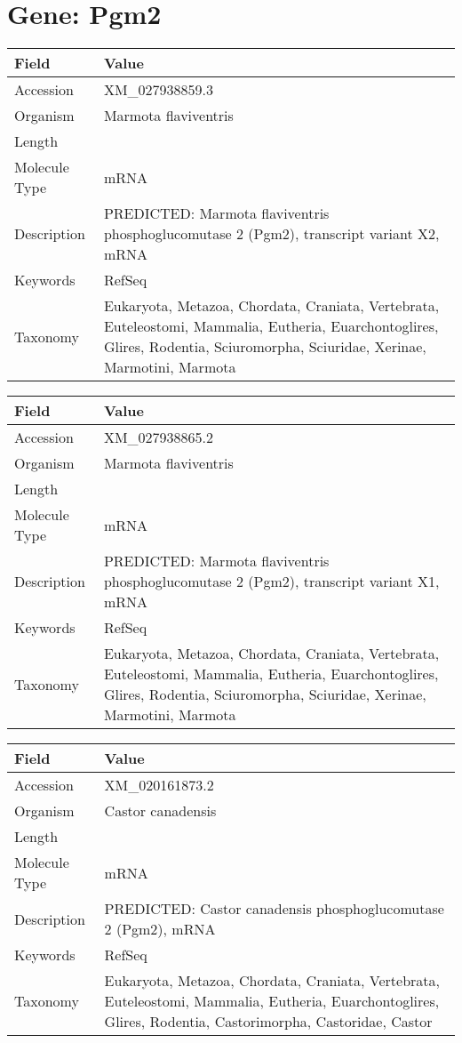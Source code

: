 \documentclass[10pt]{article}
\begin{document}
\section*{Gene: Pgm2}
{\footnotesize
\begin{longtable}{>{\raggedright\arraybackslash}p{4.5cm} >{\raggedright\arraybackslash}p{11.5cm}}
\textbf{Field} & \textbf{Value} \\
\hline
Accession & XM\_027938859.3 \\
Organism & Marmota flaviventris \\
Length & 2307 \\
Molecule Type & mRNA \\
Description & PREDICTED: Marmota flaviventris phosphoglucomutase 2 (Pgm2), transcript variant X2, mRNA \\
Keywords & RefSeq \\
Taxonomy & Eukaryota, Metazoa, Chordata, Craniata, Vertebrata, Euteleostomi, Mammalia, Eutheria, Euarchontoglires, Glires, Rodentia, Sciuromorpha, Sciuridae, Xerinae, Marmotini, Marmota \\
\end{longtable}
}

{\footnotesize
\begin{longtable}{>{\raggedright\arraybackslash}p{4.5cm} >{\raggedright\arraybackslash}p{11.5cm}}
\textbf{Field} & \textbf{Value} \\
\hline
Accession & XM\_027938865.2 \\
Organism & Marmota flaviventris \\
Length & 2265 \\
Molecule Type & mRNA \\
Description & PREDICTED: Marmota flaviventris phosphoglucomutase 2 (Pgm2), transcript variant X1, mRNA \\
Keywords & RefSeq \\
Taxonomy & Eukaryota, Metazoa, Chordata, Craniata, Vertebrata, Euteleostomi, Mammalia, Eutheria, Euarchontoglires, Glires, Rodentia, Sciuromorpha, Sciuridae, Xerinae, Marmotini, Marmota \\
\end{longtable}
}

{\footnotesize
\begin{longtable}{>{\raggedright\arraybackslash}p{4.5cm} >{\raggedright\arraybackslash}p{11.5cm}}
\textbf{Field} & \textbf{Value} \\
\hline
Accession & XM\_020161873.2 \\
Organism & Castor canadensis \\
Length & 2543 \\
Molecule Type & mRNA \\
Description & PREDICTED: Castor canadensis phosphoglucomutase 2 (Pgm2), mRNA \\
Keywords & RefSeq \\
Taxonomy & Eukaryota, Metazoa, Chordata, Craniata, Vertebrata, Euteleostomi, Mammalia, Eutheria, Euarchontoglires, Glires, Rodentia, Castorimorpha, Castoridae, Castor \\
\end{longtable}
}
\end{document}
